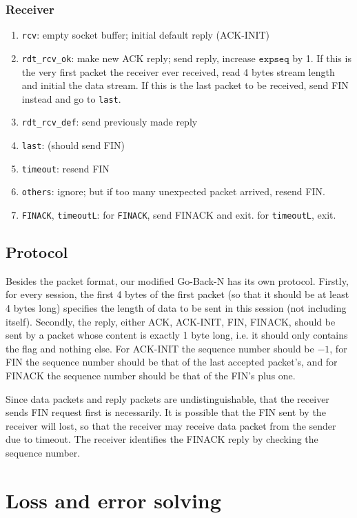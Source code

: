 \documentclass[10pt,a4paper]{article}
\begin{document}
    \subsubsection{Receiver}
    \begin{enumerate}
        \item \texttt{rcv}: empty socket buffer; initial default reply (ACK-INIT)
        \item \texttt{rdt\_rcv\_ok}: make new ACK reply; send reply, increase $\texttt{expseq}$ by 1. If this is the very first packet the receiver ever received, read 4 bytes stream length and initial the data stream. If this is the last packet to be received, send FIN instead and go to \texttt{last}.
        \item \texttt{rdt\_rcv\_def}: send previously made reply
        \item \texttt{last}: (should send FIN)
        \item \texttt{timeout}: resend FIN
        \item \texttt{others}: ignore; but if too many unexpected packet arrived, resend FIN.
        \item \texttt{FINACK}, \texttt{timeoutL}: for \texttt{FINACK}, send FINACK and exit. for \texttt{timeoutL}, exit.
    \end{enumerate}
\subsection{Protocol}
Besides the packet format, our modified Go-Back-N has its own protocol. Firstly, for every session, the first 4 bytes of the first packet (so that it should be at least 4 bytes long) specifies the length of data to be sent in this session (not including itself). Secondly, the reply, either ACK, ACK-INIT, FIN, FINACK, should be sent by a packet whose content is exactly 1 byte long, i.e. it should only contains the flag and nothing else. For ACK-INIT the sequence number should be $-1$, for FIN the sequence number should be that of the last accepted packet's, and for FINACK the sequence number should be that of the FIN's plus one.

Since data packets and reply packets are undistinguishable, that the receiver sends FIN request first is necessarily. It is possible that the FIN sent by the receiver will lost, so that the receiver may receive data packet from the sender due to timeout. The receiver identifies the FINACK reply by checking the sequence number.
\section{Loss and error solving}
\end{document}

